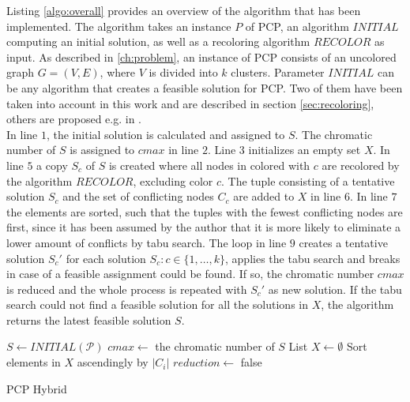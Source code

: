 Listing \ref{algo:overall} provides an overview of the algorithm that has been implemented. The algorithm takes an instance $P$ of PCP, an algorithm $\mathit{INITIAL}$ computing an initial solution, as well as a recoloring algorithm $\mathit{RECOLOR}$ as input. As described in \ref{ch:problem}, an instance of PCP consists of an uncolored graph $G=(V,E)$, where $V$ is divided into $k$ clusters. Parameter $\mathit{INITIAL}$ can be any algorithm that creates a feasible solution for PCP. Two of them have been taken into account in this work and are described in section \ref{sec:recoloring}, others are proposed e.g. in \cite{li-00}.\\
In line $1$, the initial solution is calculated and assigned to $S$. The chromatic number of $S$ is assigned to $cmax$ in line $2$. Line $3$ initializes an empty set $X$. In line $5$ a copy $S_c$ of $S$ is created where all nodes in colored with $c$ are recolored by the algorithm $\mathit{RECOLOR}$, excluding color $c$. The tuple consisting of a tentative solution $S_c$ and the set of conflicting nodes $C_c$ are added to $X$ in line $6$. In line $7$ the elements are sorted, such that the tuples with the fewest conflicting nodes are first, since it has been assumed by the author that it is more likely to eliminate a lower amount of conflicts by tabu search. The loop in line $9$ creates a tentative solution $S_c'$ for each solution $S_c : c\in \{1,\ldots ,k\}$, applies the tabu search and breaks in case of a feasible assignment could be found. If so, the chromatic number $cmax$ is reduced and the whole process is repeated with $S_c'$ as new solution. If the tabu search could not find a feasible solution for all the solutions in $X$, the algorithm returns the latest feasible solution $S$.

\begin{algorithm}[h]
$S \gets INITIAL(\mathcal{P})$\;
$cmax \gets$ the chromatic number of $S$\;
List $X \gets \emptyset $\;
Sort elements in $X$ ascendingly by $|C_i|$\;
$reduction \gets$ false\;
\;
\caption{PCP Hybrid}
\label{algo:overall}
\end{algorithm}

